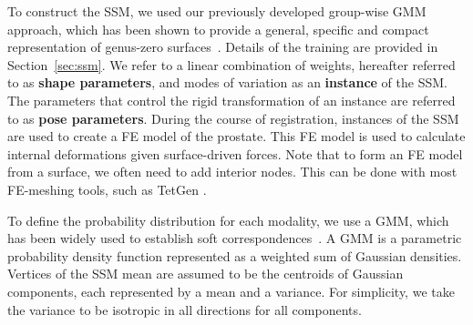 \documentclass[journal]{IEEEtran}
\begin{document}
To construct the SSM, we used our previously developed group-wise GMM approach, which has been shown to provide a general, specific and compact representation of genus-zero surfaces~\cite{Rasoulian12b}. Details of the training are provided in Section~\ref{sec:ssm}. We refer to a linear combination of weights, hereafter referred to as \textbf{shape parameters}, and modes of variation as an \textbf{instance} of the SSM. The parameters that control the rigid transformation of an instance are referred to as \textbf{pose parameters}. During the course of registration, instances of the SSM are used to create a FE model of the prostate. This FE model is used to calculate internal deformations given surface-driven forces. Note that to form an FE model from a surface, we often need to add interior nodes. This can be done with most FE-meshing tools, such as TetGen \cite{Si06a}.

To define the probability distribution for each modality, we use a GMM, which has been widely used to establish soft correspondences~\cite{Myronenko10a,Rasoulian12a,Jian11a}. A GMM is a parametric probability density function represented as a weighted sum of Gaussian densities. Vertices of the SSM mean are assumed to be the centroids of Gaussian components, each represented by a mean and a variance. For simplicity, we take the variance to be isotropic in all directions for all components.
\end{document}
